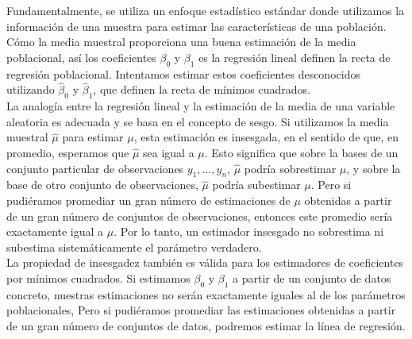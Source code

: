 Fundamentalmente, se utiliza un enfoque estadístico estándar donde utilizamos la información de una muestra para estimar las características de una población. Cómo la media muestral proporciona una buena estimación de la media poblacional, así los coeficientes $\beta_0$ y $\beta_1$ es la regresión lineal definen la recta de regresión poblacional. Intentamos estimar estos coeficientes desconocidos utilizando $\hat{\beta}_0$ y $\hat{\beta}_1$, que definen la recta de mínimos cuadrados.\\
La analogía entre la regresión lineal y la estimación de la media de una variable aleatoria es adecuada y se basa en el concepto de sesgo. Si utilizamos la media muestral $\hat{\mu}$ para estimar $\mu$, esta estimación es insesgada, en el sentido de que, en promedio, esperamos que $\hat{\mu}$ sea igual a $\mu$. Esto significa que sobre la bases de un conjunto particular de observaciones $y_1,\ldots, y_n$, $\hat{\mu}$ podría sobrestimar $\mu$, y sobre la base de otro conjunto de observaciones, $\hat{\mu}$ podría subestimar $\mu$. Pero si pudiéramos promediar un gran número de estimaciones de $\mu$ obtenidas a partir de un gran número de conjuntos de observaciones, entonces este promedio sería exactamente igual a $\mu$. Por lo tanto, un estimador insesgado no sobrestima ni subestima sistemáticamente el parámetro verdadero.\\
La propiedad de insesgadez también es válida para los estimadores de coeficientes por mínimos cuadrados. Si estimamos $\beta_0$ y $\beta_1$ a partir de un conjunto de datos concreto, nuestras estimaciones no serán exactamente iguales al de los parámetros poblacionales, Pero si pudiéramos promediar las estimaciones obtenidas a partir de un gran número de conjuntos de datos, podremos estimar la línea de regresión.\\

